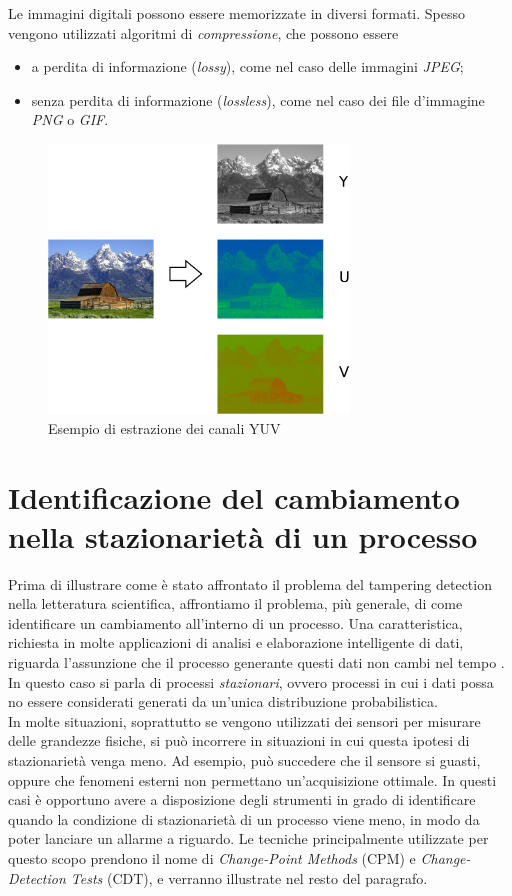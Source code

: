 Le immagini digitali possono essere memorizzate in diversi formati.
Spesso vengono utilizzati algoritmi di \textit{compressione}, che possono essere
\begin{itemize}
	\item a perdita di informazione (\textit{lossy}), come nel caso delle immagini \textit{JPEG};
	\item senza perdita di informazione (\textit{lossless}), come nel caso dei file d'immagine \textit{PNG} o \textit{GIF}.
\end{itemize}
	\begin{figure}[tb]
		\centering
		\includegraphics[width=8cm]{./pictures/yuv}
		\caption{Esempio di estrazione dei canali YUV}
		\label{fig:yuv}
	\end{figure}
	



\section{Identificazione del cambiamento nella stazionariet\`a di un processo}
\label{cdt}
Prima di illustrare come \`e stato affrontato il problema del tampering detection nella letteratura scientifica, affrontiamo il problema, pi\`u generale, di come identificare un cambiamento all'interno di un processo.
Una caratteristica, richiesta in molte applicazioni di analisi e elaborazione intelligente di dati, riguarda l'assunzione che il processo generante questi dati non cambi nel tempo \cite{alippi2014intelligence}. In questo caso si parla di processi \textit{stazionari}, ovvero processi in cui i dati possa no essere considerati generati da un'unica distribuzione probabilistica. \\
In molte situazioni, soprattutto se vengono utilizzati dei sensori per misurare delle grandezze fisiche, si pu\`o incorrere in situazioni in cui questa ipotesi di stazionariet\`a venga meno.
Ad esempio, pu\`o succedere che il sensore si guasti, oppure che fenomeni esterni non permettano un'acquisizione ottimale. 
In questi casi \`e opportuno avere a disposizione degli strumenti in grado di identificare quando la condizione di stazionariet\`a di un processo viene meno, in modo da poter lanciare un allarme a riguardo. 
Le tecniche principalmente utilizzate per questo scopo prendono il nome di \textit{Change-Point Methods} (CPM) e \textit{Change-Detection Tests} (CDT), e verranno illustrate nel resto del paragrafo.	
